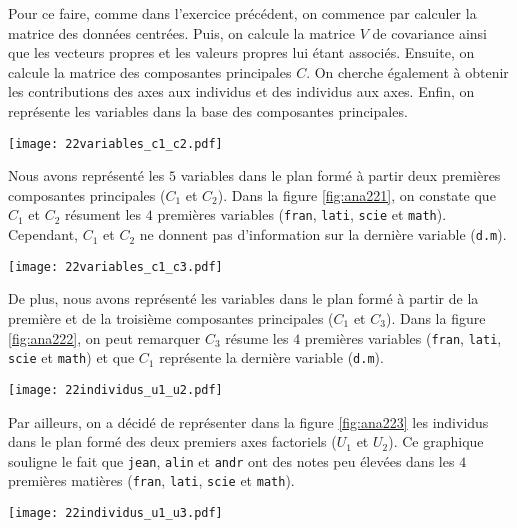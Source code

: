 \documentclass{article}
\begin{document}
\begin{multicols}{2}
Pour ce faire, comme dans l'exercice précédent, on commence par calculer la matrice des données centrées. Puis, on calcule la matrice $V$ de covariance ainsi que les vecteurs propres et les valeurs propres lui étant associés. Ensuite, on calcule la matrice des composantes principales $C$. On cherche également à obtenir les contributions des axes aux individus et des individus aux axes. Enfin, on représente les variables dans la base des composantes principales. 

\begingroup
    \centering
   \texttt{[image: 22variables\_c1\_c2.pdf]}
    \label{fig:ana221}
\endgroup

Nous avons représenté les $5$ variables dans le plan formé à partir deux premières composantes principales ($C_1$ et $C_2$). Dans la figure \ref{fig:ana221}, on constate que $C_1$ et $C_2$ résument les $4$ premières variables (\texttt{fran}, \texttt{lati}, \texttt{scie} et \texttt{math}). Cependant, $C_1$ et $C_2$ ne donnent pas d'information sur la dernière variable (\texttt{d.m}).

\begingroup
    \centering
   \texttt{[image: 22variables\_c1\_c3.pdf]}
    \label{fig:ana222}
\endgroup

De plus, nous avons représenté les variables dans le plan formé à partir de la première et de la troisième composantes principales ($C_1$ et $C_3$). Dans la figure \ref{fig:ana222}, on peut remarquer $C_3$ résume les $4$ premières variables (\texttt{fran}, \texttt{lati}, \texttt{scie} et \texttt{math}) et que $C_1$ représente la dernière variable (\texttt{d.m}).

\begingroup
    \centering
   \texttt{[image: 22individus\_u1\_u2.pdf]}
    \label{fig:ana223}
\endgroup

Par ailleurs, on a décidé de représenter dans la figure \ref{fig:ana223} les individus dans le plan formé des deux premiers axes factoriels ($U_1$ et $U_2$). Ce graphique souligne le fait que \texttt{jean}, \texttt{alin} et \texttt{andr} ont des notes peu élevées dans les $4$ premières matières (\texttt{fran}, \texttt{lati}, \texttt{scie} et \texttt{math}).

\begingroup
    \centering
   \texttt{[image: 22individus\_u1\_u3.pdf]}
    \label{fig:ana224}
\endgroup


\end{multicols}
\end{document}
